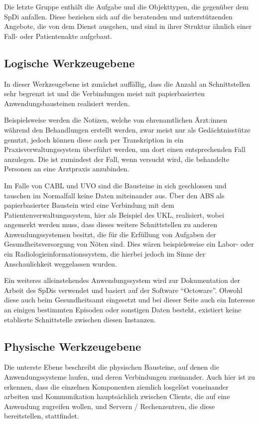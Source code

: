 Die letzte Gruppe enthält die Aufgabe und die Objekttypen, die gegenüber dem \ac{SpDi} anfallen. Diese beziehen sich auf die beratenden und unterstützenden Angebote, die von dem Dienst ausgehen, und sind in ihrer Struktur ähnlich einer Fall- oder Patientenakte aufgebaut.

\subsection{Logische Werkzeugebene}

In dieser Werkzeugebene ist zunächst auffällig, dass die Anzahl an Schnittstellen sehr begrenzt ist und die Verbindungen meist mit papierbasierten Anwendungsbausteinen realisiert werden.

Beispielsweise werden die Notizen, welche von ehrenamtlichen Ärzt:innen während den Behandlungen erstellt werden, zwar meist nur als Gedächtnisstütze genutzt, jedoch können diese auch per Transkription in ein Praxisverwaltungssystem überführt werden, um dort einen entsprechenden Fall anzulegen. Die ist zumindest der Fall, wenn versucht wird, die behandelte Personen an eine Arztpraxis anzubinden.

Im Falle von \ac{CABL} und \ac{UVO} sind die Bausteine in sich geschlossen und tauschen im Normalfall keine Daten miteinander aus. Über den \ac{ABS} als papierbasierter Baustein wird eine Verbindung mit dem Patientenverwaltungssystem, hier als Beispiel des \ac{UKL}, realisiert, wobei angemerkt werden muss, dass dieses weitere Schnittstellen zu anderen Anwendungssystemen besitzt, die für die Erfüllung von Aufgaben der Gesundheitsversorgung von Nöten sind. Dies wären beispielsweise ein Labor- oder ein Radiologieinformationssystem, die hierbei jedoch im Sinne der Anschaulichkeit weggelassen wurden.

Ein weiteres alleinstehendes Anwendungssystem wird zur Dokumentation der Arbeit des \acp{SpDi} verwendet und basiert auf der Software \enquote{Octoware}. Obwohl diese auch beim Gesundheitsamt eingesetzt und bei dieser Seite auch ein Interesse an einigen bestimmten Episoden oder sonstigen Daten besteht, existiert keine etablierte Schnittstelle zwischen diesen Instanzen.

\subsection{Physische Werkzeugebene}

Die unterste Ebene beschreibt die physischen Bausteine, auf denen die Anwendungssysteme laufen, und deren Verbindungen zueinander. Auch hier ist zu erkennen, dass die einzelnen Komponenten ziemlich losgelöst voneinander arbeiten und Kommunikation hauptsächlich zwischen Clients, die auf eine Anwendung zugreifen wollen, und Servern / Rechenzentren, die diese bereitstellen, stattfindet.

